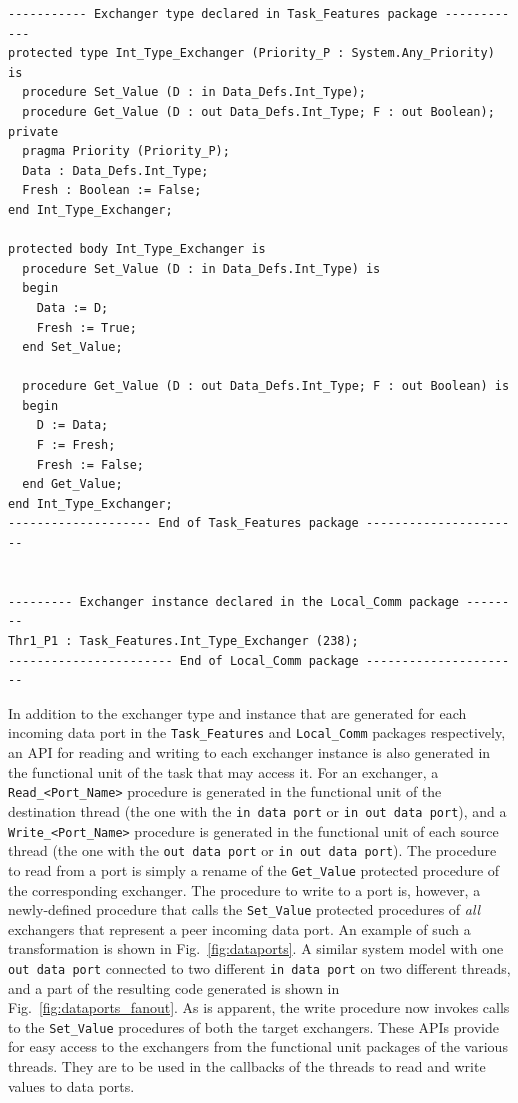 \begin{minipage}{\listingwidth}
\lstset{language=ada}
\begin{lstlisting}[label=exchangerSpec,caption=The
\texttt{Int\_Type\_Exchanger} generated type.]
----------- Exchanger type declared in Task_Features package ------------
protected type Int_Type_Exchanger (Priority_P : System.Any_Priority) is  
  procedure Set_Value (D : in Data_Defs.Int_Type);                       
  procedure Get_Value (D : out Data_Defs.Int_Type; F : out Boolean);     
private
  pragma Priority (Priority_P);
  Data : Data_Defs.Int_Type;
  Fresh : Boolean := False;
end Int_Type_Exchanger;

protected body Int_Type_Exchanger is
  procedure Set_Value (D : in Data_Defs.Int_Type) is
  begin
    Data := D; 
    Fresh := True;
  end Set_Value;

  procedure Get_Value (D : out Data_Defs.Int_Type; F : out Boolean) is
  begin
    D := Data; 
    F := Fresh; 
    Fresh := False;
  end Get_Value;
end Int_Type_Exchanger;
-------------------- End of Task_Features package ----------------------


--------- Exchanger instance declared in the Local_Comm package --------
Thr1_P1 : Task_Features.Int_Type_Exchanger (238);
----------------------- End of Local_Comm package ----------------------
\end{lstlisting}
\end{minipage}

In addition to the exchanger type and instance that are generated for
each incoming data port in the \texttt{Task\_Features} and
\texttt{Local\_Comm} packages respectively, an API for reading and
writing to each exchanger instance is also generated in the functional
unit of the task that may access it. For an exchanger, a
\texttt{Read\_<Port\_Name>} procedure is generated in the functional
unit of the destination thread (the one with the \texttt{in data port}
or \texttt{in out data port}), and a \texttt{Write\_<Port\_Name>}
procedure is generated in the functional unit of each source thread
(the one with the \texttt{out data port} or \texttt{in out data
  port}). The procedure to read from a port is simply a rename of the
\texttt{Get\_Value} protected procedure of the corresponding
exchanger. The procedure to write to a port is, however, a
newly-defined procedure that calls the \texttt{Set\_Value} protected
procedures of \emph{all} exchangers that represent a peer incoming
data port. An example of such a transformation is shown in
Fig.~\ref{fig:dataports}. A similar system model with one \texttt{out
  data port} connected to two different \texttt{in data port} on two
different threads, and a part of the resulting code generated is shown
in Fig.~\ref{fig:dataports_fanout}. As is apparent, the write
procedure now invokes calls to the \texttt{Set\_Value} procedures of
both the target exchangers. These APIs provide for easy access to the
exchangers from the functional unit packages of the various
threads. They are to be used in the callbacks of the threads to read
and write values to data ports.

